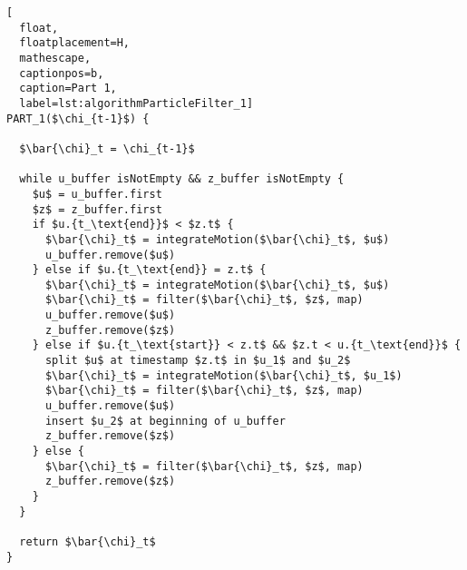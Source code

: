 \begin{lstlisting}[
  float,
  floatplacement=H,
  mathescape,
  captionpos=b,
  caption=Part 1,
  label=lst:algorithmParticleFilter_1]
PART_1($\chi_{t-1}$) {

  $\bar{\chi}_t = \chi_{t-1}$

  while u_buffer isNotEmpty && z_buffer isNotEmpty {
    $u$ = u_buffer.first
    $z$ = z_buffer.first
    if $u.{t_\text{end}}$ < $z.t$ {
      $\bar{\chi}_t$ = integrateMotion($\bar{\chi}_t$, $u$)
      u_buffer.remove($u$)
    } else if $u.{t_\text{end}} = z.t$ {
      $\bar{\chi}_t$ = integrateMotion($\bar{\chi}_t$, $u$)
      $\bar{\chi}_t$ = filter($\bar{\chi}_t$, $z$, map)
      u_buffer.remove($u$)
      z_buffer.remove($z$)
    } else if $u.{t_\text{start}} < z.t$ && $z.t < u.{t_\text{end}}$ {
      split $u$ at timestamp $z.t$ in $u_1$ and $u_2$
      $\bar{\chi}_t$ = integrateMotion($\bar{\chi}_t$, $u_1$)
      $\bar{\chi}_t$ = filter($\bar{\chi}_t$, $z$, map)
      u_buffer.remove($u$)
      insert $u_2$ at beginning of u_buffer
      z_buffer.remove($z$)
    } else {
      $\bar{\chi}_t$ = filter($\bar{\chi}_t$, $z$, map)
      z_buffer.remove($z$)
    }
  }

  return $\bar{\chi}_t$
}
\end{lstlisting}
